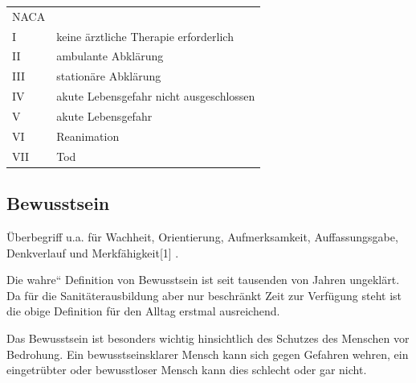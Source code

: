 \documentclass{article}
\begin{document}
\begin{center}
\begin{tabular}{m{1.201cm}m{12.1cm}}
\centering  NACA\par

 &
\\
\centering I\par

 &
 keine \"arztliche Therapie erforderlich

\\
\centering II\par

 &
 ambulante Abkl\"arung

\\
\centering III\par

 &
 station\"are Abkl\"arung

\\
\centering IV\par

 &
 akute Lebensgefahr nicht ausgeschlossen

\\
\centering V\par

 &
 akute Lebensgefahr

\\
\centering VI\par

 &
 Reanimation

\\
\centering VII\par

 &
 Tod

\\
\end{tabular}
\end{center}
\subsection{Bewusstsein}
\"Uberbegriff u.a. f\"ur Wachheit, Orientierung, Aufmerksamkeit,
Auffassungsgabe, Denkverlauf und
Merkf\"ahigkeit\label{ref:JRcite1Pschyrembel259}[1] . 

Die {\quotedblbase}wahre{\textquotedblleft} Definition von Bewusstsein
ist seit tausenden von Jahren ungekl\"art. Da f\"ur die
Sanit\"aterausbildung aber nur beschr\"ankt Zeit zur Verf\"ugung steht
ist die obige Definition f\"ur den Alltag erstmal ausreichend.

Das Bewusstsein ist besonders wichtig hinsichtlich des Schutzes des
Menschen vor Bedrohung. Ein bewusstseinsklarer Mensch kann sich gegen
Gefahren wehren, ein eingetr\"ubter oder bewusstloser Mensch kann dies
schlecht oder gar nicht. 
\end{document}
